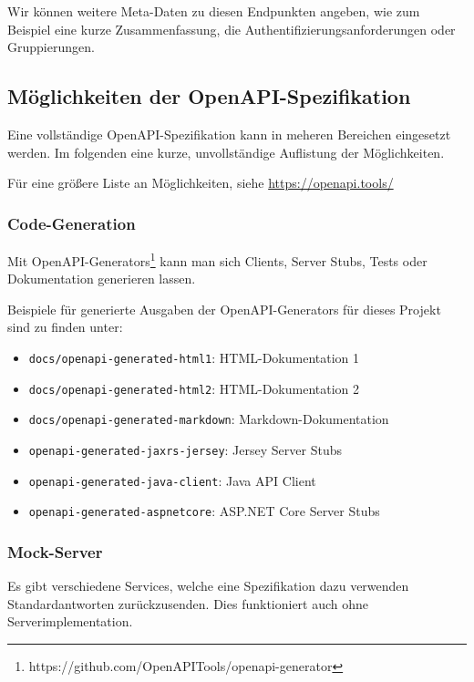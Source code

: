 Wir können weitere Meta-Daten zu diesen Endpunkten angeben, wie zum Beispiel eine kurze Zusammenfassung, die Authentifizierungsanforderungen oder Gruppierungen.

\subsection{Möglichkeiten der OpenAPI-Spezifikation}
Eine vollständige OpenAPI-Spezifikation kann in meheren Bereichen eingesetzt werden. 
Im folgenden eine kurze, unvollständige Auflistung der Möglichkeiten.

Für eine größere Liste an Möglichkeiten, siehe \url{https://openapi.tools/}

\subsubsection*{Code-Generation}

Mit OpenAPI-Generators\footnote{https://github.com/OpenAPITools/openapi-generator} kann man sich Clients, Server Stubs, Tests oder Dokumentation generieren lassen.

Beispiele für generierte Ausgaben der OpenAPI-Generators für dieses Projekt sind zu finden unter:
\begin{itemize}
    \item \texttt{docs/openapi-generated-html1}: HTML-Dokumentation 1
    \item \texttt{docs/openapi-generated-html2}: HTML-Dokumentation 2
    \item \texttt{docs/openapi-generated-markdown}: Markdown-Dokumentation
    \item \texttt{openapi-generated-jaxrs-jersey}: Jersey Server Stubs
    \item \texttt{openapi-generated-java-client}: Java API Client
    \item \texttt{openapi-generated-aspnetcore}: ASP.NET Core Server Stubs
\end{itemize}

\subsubsection*{Mock-Server}

Es gibt verschiedene Services, welche eine Spezifikation dazu verwenden Standardantworten zurückzusenden. Dies funktioniert auch ohne Serverimplementation.
